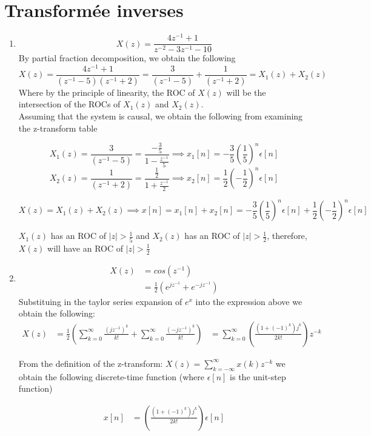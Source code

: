 \documentclass{article}
\begin{document}
\section{Transformée inverses}
\begin{enumerate}
\item
    $$
        X(z)= \frac{4z^{-1} + 1}{z^{-2} -3z^{-1} -10}
    $$
    By partial fraction decomposition, we obtain the following
    $$
        X(z)= \frac{4z^{-1} + 1}{(z^{-1}-5)(z^{-1}+2)}= \frac{3}{(z^{-1} - 5)} + \frac{1}{(z^{-1} + 2)} = X_1(z) + X_2(z)
    $$
         Where by the principle of linearity, the ROC of $X(z)$ will be the intersection of the ROCs of $X_1(z)$ and $X_2(z)$.\\

         Assuming that the system is causal, we obtain the following from examining the z-transform table

$$
    X_1(z) = \frac{3}{(z^{-1} - 5)} = \frac{-\frac{3}{5}}{1-\frac{z^{-1}}{5}} \implies  x_1[n]= -\frac{3}{5}\left( \frac{1}{5}\right)^n\epsilon[n]
$$
$$
    X_2(z) = \frac{1}{(z^{-1} + 2)} = \frac{\frac{1}{2}}{1 +\frac{z^{-1}}{2}} \implies x_2[n]=\frac{1}{2}\left( -\frac{1}{2}\right)^n\epsilon[n]
$$

$$
X(z) = X_1(z) + X_2(z) \implies x[n]= x_1[n] + x_2[n] = -\frac{3}{5}\left( \frac{1}{5}\right)^n\epsilon[n] + \frac{1}{2}\left( -\frac{1}{2}\right)^n\epsilon[n]
$$

        $X_1(z)$ has an ROC of $|z| > \frac{1}{5}$ and $X_2(z)$ has an ROC of $|z| > \frac{1}{2} $, therefore, $X(z)$ will have an ROC of $|z| > \frac{1}{2}$

\item
    \begin{align}
        X(z) &= cos(z^{-1}) \nonumber\\
             &= \frac{1}{2}\left( e^{jz^{-1}} + e^{-jz^{-1}}\right)
    \end{align}
    Substituing in the taylor series expansion of $e^x$ into the expression above we obtain the following:
    \begin{align}
        X(z) &= \frac{1}{2}\left( \sum_{k=0}^{\infty} \frac{(jz^{-1})^k}{k!}+ \sum_{k=0}^{\infty} \frac{(-jz^{-1})^k}{k!} \right)
             &= \sum_{k=0}^{\infty} \left( \frac{(1+(-1)^k)j^k}{2k!} \right)z^{-k}
    \end{align}

        From the definition of the z-transform: $X(z)= \sum_{k=-\infty}^{\infty} x(k)z^{-k}$ we obtain the following discrete-time function (where $\epsilon[n]$ is the unit-step function)

    \begin{align}
        x[n] &= \left( \frac{(1 +(-1)^k)j^k}{2k!}\right)\epsilon[n]
    \end{align}
\end{enumerate}
\end{document}
